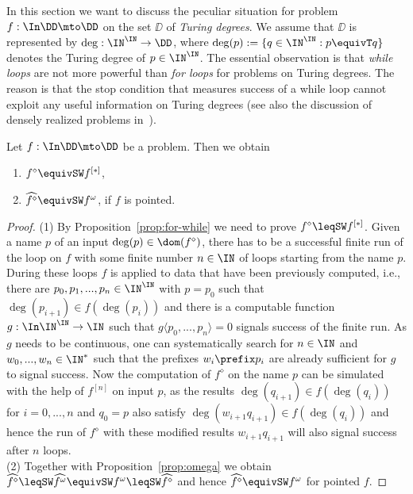 In this section we want to discuss the peculiar situation for problem $f:\In\DD\mto\DD$ on the set
$\DD$ of {\em Turing degrees}. We assume that $\DD$ is represented by $\deg:\IN^\IN\to\DD$,
where $\deg(p):=\{q\in\IN^\IN:p\equivT q\}$ denotes the Turing degree of $p\in\IN^\IN$.
The essential observation is that {\em while loops} are not more powerful than {\em for loops} for problems
on Turing degrees. The reason is that the stop condition that measures success of a while loop
cannot exploit any useful information on Turing degrees (see also the discussion of densely realized problems
in~\cite{BHK17a,BP18}).

\begin{prop}
\label{prop:Turing}
Let ${f:\In\DD\mto\DD}$ be a problem. Then we obtain 
\begin{enumerate}
\item $f^\diamond\equivSW f^{[*]}$,
\item $\widehat{f^\diamond}\equivSW f^\omega$, if $f$ is pointed.
\end{enumerate}
\end{prop}
\begin{proof}
(1) By Proposition~\ref{prop:for-while} we need to prove $f^\diamond\leqSW f^{[*]}$.
Given a name $p$ of an input $\deg(p)\in\dom(f^\diamond)$, there has to be a successful finite run of the loop on $f$
with some finite number $n\in\IN$ of loops starting from the name $p$. 
During these loops $f$ is applied to data that have been previously computed, i.e., there are
$p_0,p_1,...,p_n\in\IN^\IN$ with $p=p_0$ such that $\deg(p_{i+1})\in f(\deg(p_i))$ and there is a computable 
function $g:\In\IN^\IN\to\IN$
such that $g\langle p_0,...,p_n\rangle=0$ signals success of the finite run. As $g$ needs to be continuous,
one can systematically search for $n\in\IN$ and $w_0,...,w_n\in\IN^*$ such that
the prefixes $w_i\prefix p_i$ are already sufficient for $g$ to signal success.
Now the computation of $f^\diamond$ on the name $p$ can be simulated with 
the help of $f^{[n]}$ on input $p$, as the results $\deg(q_{i+1})\in f(\deg(q_i))$ for $i=0,...,n$ and $q_0=p$
also satisfy $\deg(w_{i+1}q_{i+1})\in f(\deg(q_i))$ and hence the run of $f^\diamond$ with these modified
results $w_{i+1}q_{i+1}$ will also signal success after $n$ loops. \\
(2) Together with Proposition~\ref{prop:omega} we obtain $\widehat{f^\diamond}\leqSW \widehat{f^\omega}\equivSW f^\omega\leqSW\widehat{f^\diamond}$ and hence $\widehat{f^\diamond}\equivSW f^\omega$ for pointed $f$.
\end{proof}

